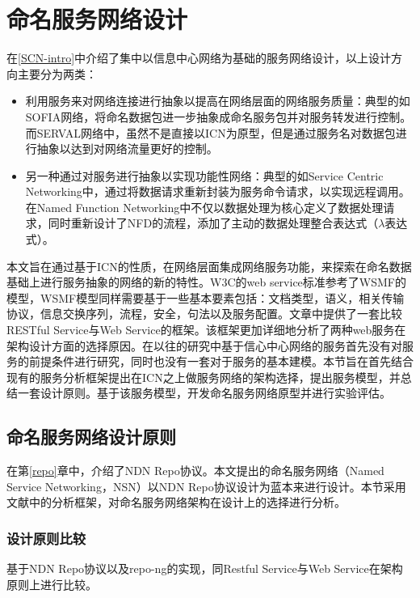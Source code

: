 

\chapter{命名服务网络设计}
在\ref{SCN-intro}中介绍了集中以信息中心网络为基础的服务网络设计，以上设计方向主要分为两类：
\begin{itemize}
\item 利用服务来对网络连接进行抽象以提高在网络层面的网络服务质量：典型的如SOFIA\cite{wu2014sofia}网络，将命名数据包进一步抽象成命名服务包并对服务转发进行控制。而SERVAL\cite{nordstrom2012serval}网络中，虽然不是直接以ICN为原型，但是通过服务名对数据包进行抽象以达到对网络流量更好的控制。
\item 另一种通过对服务进行抽象以实现功能性网络：典型的如Service Centric Networking\cite{braun2011service}中，通过将数据请求重新封装为服务命令请求，以实现远程调用。在Named Function Networking\cite{tschudin2014named}中不仅以数据处理为核心定义了数据处理请求，同时重新设计了NFD的流程，添加了主动的数据处理整合表达式（$\lambda$表达式）。
\end{itemize}

本文旨在通过基于ICN的性质，在网络层面集成网络服务功能，来探索在命名数据基础上进行服务抽象的网络的新的特性。W3C的web service标准参考了WSMF的模型，WSMF模型同样需要基于一些基本要素包括：文档类型，语义，相关传输协议，信息交换序列，流程，安全，句法以及服务配置。文章\cite{pautasso2008restful}中提供了一套比较RESTful Service与Web Service的框架。该框架更加详细地分析了两种web服务在架构设计方面的选择原因。在以往的研究中基于信心中心网络的服务首先没有对服务的前提条件进行研究，同时也没有一套对于服务的基本建模。本节旨在首先结合现有的服务分析框架提出在ICN之上做服务网络的架构选择，提出服务模型，并总结一套设计原则。基于该服务模型，开发命名服务网络原型并进行实验评估。

\section{命名服务网络设计原则}
在第\ref{repo}章中，介绍了NDN Repo协议。本文提出的命名服务网络（Named Service Networking，NSN）以NDN Repo协议设计为蓝本来进行设计。本节采用文献\cite{pautasso2008restful}中的分析框架，对命名服务网络架构在设计上的选择进行分析。

\subsection{设计原则比较}
基于NDN Repo协议以及repo-ng的实现，同Restful Service与Web Service在架构原则上进行比较。

